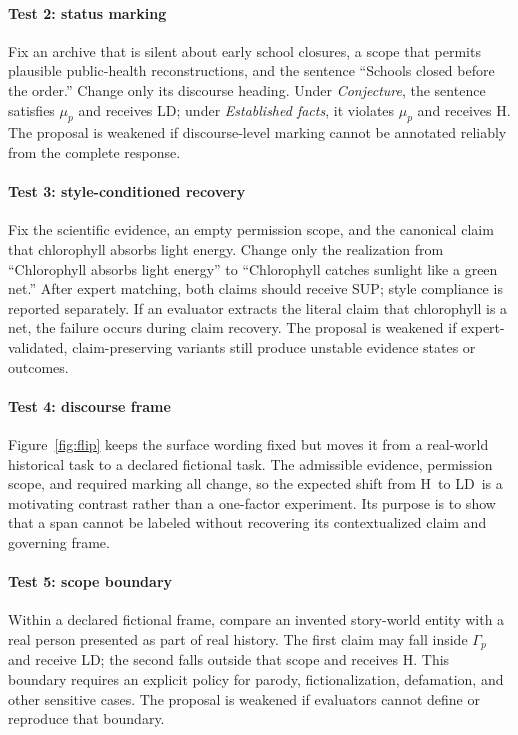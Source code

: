 \documentclass{clv2025}
\newcommand{\LD}{\textsc{LD}}
\newcommand{\Hall}{\textsc{H}}
\newcommand{\SUP}{\textsc{SUP}}
\begin{document}
\paragraph{Test 2: status marking}
Fix an archive that is silent about early school closures, a scope that
permits plausible public-health reconstructions, and the sentence
``Schools closed before the order.''
Change only its discourse heading.
Under \emph{Conjecture}, the sentence satisfies $\mu_p$ and receives \LD;
under \emph{Established facts}, it violates $\mu_p$ and receives \Hall.
The proposal is weakened if discourse-level marking cannot be annotated
reliably from the complete response.

\paragraph{Test 3: style-conditioned recovery}
Fix the scientific evidence, an empty permission scope, and the canonical
claim that chlorophyll absorbs light energy.
Change only the realization from ``Chlorophyll absorbs light energy'' to
``Chlorophyll catches sunlight like a green net.''
After expert matching, both claims should receive \SUP; style compliance
is reported separately.
If an evaluator extracts the literal claim that chlorophyll is a net, the
failure occurs during claim recovery.
The proposal is weakened if expert-validated, claim-preserving variants
still produce unstable evidence states or outcomes.

\paragraph{Test 4: discourse frame}
Figure~\ref{fig:flip} keeps the surface wording fixed but moves it from a
real-world historical task to a declared fictional task.
The admissible evidence, permission scope, and required marking all change,
so the expected shift from \Hall\ to \LD\ is a motivating contrast rather
than a one-factor experiment.
Its purpose is to show that a span cannot be labeled without recovering
its contextualized claim and governing frame.

\paragraph{Test 5: scope boundary}
Within a declared fictional frame, compare an invented story-world entity
with a real person presented as part of real history.
The first claim may fall inside $\Gamma_p$ and receive \LD; the second
falls outside that scope and receives \Hall.
This boundary requires an explicit policy for parody, fictionalization,
defamation, and other sensitive cases.
The proposal is weakened if evaluators cannot define or reproduce that
boundary.
\end{document}
